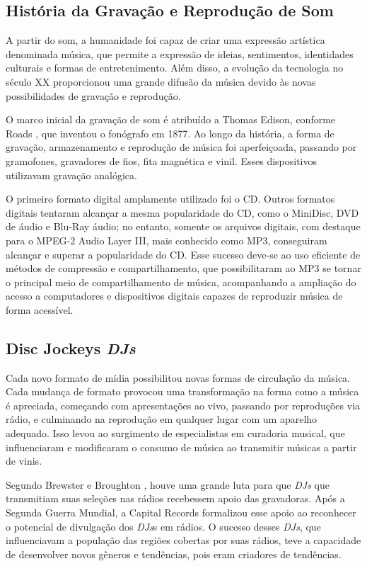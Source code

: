 \subsection{História da Gravação e Reprodução de Som}
A partir do som, a humanidade foi capaz de criar uma expressão artística denominada música, que permite a expressão de ideias, sentimentos, identidades culturais e formas de entretenimento. Além disso, a evolução da tecnologia no século XX proporcionou uma grande difusão da música devido às novas possibilidades de gravação e reprodução. \par
O marco inicial da gravação de som é atribuído a Thomas Edison, conforme Roads \cite{roads1996computer}, que inventou o fonógrafo em 1877. Ao longo da história, a forma de gravação, armazenamento e reprodução de música foi aperfeiçoada, passando por gramofones, gravadores de fios, fita magnética e vinil. Esses dispositivos utilizavam gravação analógica. \par
O primeiro formato digital amplamente utilizado foi o CD. Outros formatos digitais tentaram alcançar a mesma popularidade do CD, como o MiniDisc, DVD de áudio e Blu-Ray áudio; no entanto, somente os arquivos digitais, com destaque para o MPEG-2 Audio Layer III, mais conhecido como MP3, conseguiram alcançar e superar a popularidade do CD. Esse sucesso deve-se ao uso eficiente de métodos de compressão e compartilhamento, que possibilitaram ao MP3 se tornar o principal meio de compartilhamento de música, acompanhando a ampliação do acesso a computadores e dispositivos digitais capazes de reproduzir música de forma acessível.

\subsection{Disc Jockeys \textit{DJs}}

Cada novo formato de mídia possibilitou novas formas de circulação da música. Cada mudança de formato provocou uma transformação na forma como a música é apreciada, começando com apresentações ao vivo, passando por reproduções via rádio, e culminando na reprodução em qualquer lugar com um aparelho adequado. Isso levou ao surgimento de especialistas em curadoria musical, que influenciaram e modificaram o consumo de música ao transmitir músicas a partir de vinis.

Segundo Brewster e Broughton \cite{lastnight}, houve uma grande luta para que \textit{DJs} que transmitiam suas seleções nas rádios recebessem apoio das gravadoras. Após a Segunda Guerra Mundial, a Capital Records formalizou esse apoio ao reconhecer o potencial de divulgação dos \textit{DJs}s em rádios. O sucesso desses \textit{DJs}, que influenciavam a população das regiões cobertas por suas rádios, teve a capacidade de desenvolver novos gêneros e tendências, pois eram criadores de tendências.

